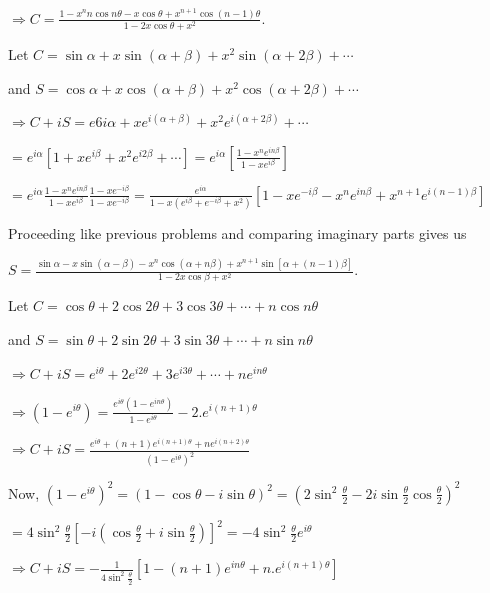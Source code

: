   $\Rightarrow C = \frac{1 - x^nn\cos n\theta - x\cos\theta + x^{n + 1}\cos(n - 1)\theta}{1 - 2x\cos\theta +
    x^2}$.
\item Let $C = \sin\alpha + x\sin(\alpha + \beta) + x^2\sin(\alpha + 2\beta) + \cdots$

  and $S = \cos\alpha + x\cos(\alpha + \beta) + x^2\cos(\alpha + 2\beta) + \cdots$

  $\Rightarrow C + iS = e6{i\alpha} + xe^{i(\alpha + \beta)} + x^2e^{i(\alpha + 2\beta)} + \cdots$

  $= e^{i\alpha}\left[1 + xe^{i\beta} + x^2e^{i2\beta} + \cdots\right] = e^{i\alpha}\left[\frac{1 -
      x^ne^{in\beta}}{1 - xe^{i\beta}}\right]$

  $= e^{i\alpha}\frac{1 - x^ne^{in\beta}}{1 - xe^{i\beta}}\frac{1 - xe^{-i\beta}}{1 - xe^{-i\beta}} =
  \frac{e^{i\alpha}}{1 - x\left(e^{i\beta} + e^{-i\beta} + x^2\right)}\left[1 - xe^{-i\beta} -
    x^ne^{in\beta} + x^{n + 1}e^{i(n - 1)\beta}\right]$

  Proceeding like previous problems and comparing imaginary parts gives us

  $S = \frac{\sin\alpha - x\sin(\alpha - \beta) - x^n\cos(\alpha + n\beta) + x^{n + 1}\sin[\alpha + (n -
      1)\beta]}{1 - 2x\cos\beta + x^2}$.
\item Let $C = \cos\theta + 2\cos2\theta + 3\cos3\theta + \cdots + n\cos n\theta$

  and $S = \sin\theta + 2\sin2\theta + 3\sin3\theta + \cdots + n\sin n\theta$

  $\Rightarrow C + iS = e^{i\theta} + 2e^{i2\theta} + 3e^{i3\theta} + \cdots + ne^{in\theta}$

  $\Rightarrow \left(1 - e^{i\theta}\right) = \frac{e^{i\theta}\left(1 - e^{in\theta}\right)}{1 -
    e^{i\theta}} - 2.e^{i(n + 1)\theta}$

  $\Rightarrow C + iS = \frac{e^{i\theta} + (n + 1)e^{i(n + 1)\theta} + ne^{i(n + 2)\theta}}{\left(1 -
    e^{i\theta}\right)^2}$

  Now, $\left(1 - e^{i\theta}\right)^2 = (1 - \cos\theta - i\sin\theta)^2 = \left(2\sin^2\frac{\theta}{2} -
  2i\sin\frac{\theta}{2}\cos\frac{\theta}{2}\right)^2$

  $= 4\sin^2\frac{\theta}{2}\left[-i\left(\cos\frac{\theta}{2} + i\sin\frac{\theta}{2}\right)\right]^2 =
  -4\sin^2\frac{\theta}{2}e^{i\theta}$

  $\Rightarrow C + iS = -\frac{1}{4\sin^2\frac{\theta}{2}}\left[1 - (n + 1)e^{in\theta} + n.e^{i(n +
      1)\theta}\right]$


